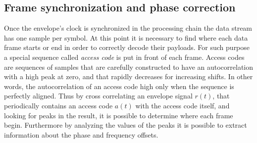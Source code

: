 
\subsection{Frame synchronization and phase correction} \label{sec:phasecorr}

Once the envelope's clock is synchronized in the processing chain the data stream has one sample per symbol. At this point it is necessary to find where each data frame starts or end in order to correctly decode their payloads. For such purpose a special sequence called \emph{access code} is put in front of each frame. Access codes are sequences of samples that are carefully constructed to have an autocorrelation with a high peak at zero, and that rapidly decreases for increasing shifts. In other words, the autocorrelation of an access code high only when the sequence is perfectly aligned. Thus by cross correlating an envelope signal \(r(t)\), that periodically contains an access code \(a(t)\) with the access code itself, and looking for peaks in the result, it is possible to determine where each frame begin. Furthermore by analyzing the values of the peaks it is possible to extract information about the phase and frequency offsets.

